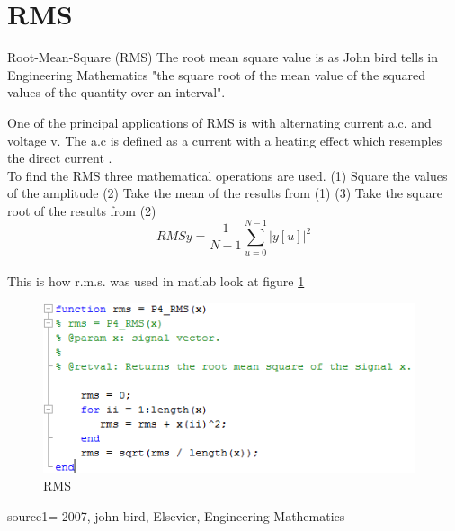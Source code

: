 \section{RMS}
Root-Mean-Square (RMS)
The root mean square value is as John bird tells in Engineering Mathematics \citep{Bird2007} "the square root of the mean value of the squared values of the quantity over an interval".


One of the principal applications of RMS is with alternating current a.c. and voltage v. The a.c is defined as a current with a heating effect which resemples the direct current \citep{Bird2007}.
\\
To find the RMS three mathematical operations are used.
(1)	Square the values of the amplitude
(2)	Take the mean of the results from (1)
(3)	Take the square root of the results from (2)
\begin{equation}\label{eq:RMS formular}
RMSy = \frac{1}{N-1}\sum_{u=0}^{N-1}|y[u]|^2
\end{equation}
\\
This is how r.m.s. was used in matlab look at figure \ref{RMS}
\begin{figure}
	\begin{center}
		\includegraphics[height=5cm]{fig/RMS_matlabCode.png}
		\caption{RMS}
		\label{RMS}
	\end{center}
\end{figure}

source1= 2007, john bird, Elsevier, Engineering Mathematics
